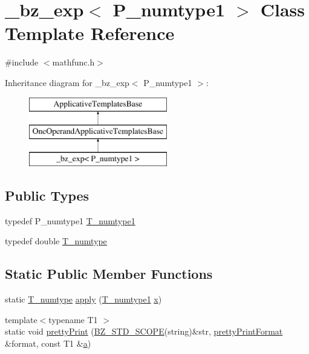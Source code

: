 \hypertarget{class__bz__exp}{}\section{\+\_\+bz\+\_\+exp$<$ P\+\_\+numtype1 $>$ Class Template Reference}
\label{class__bz__exp}


{\ttfamily \#include $<$mathfunc.\+h$>$}

Inheritance diagram for \+\_\+bz\+\_\+exp$<$ P\+\_\+numtype1 $>$\+:\begin{figure}[H]
\begin{center}
\leavevmode
\includegraphics[height=3.000000cm]{class__bz__exp}
\end{center}
\end{figure}
\subsection*{Public Types}
\begin{DoxyCompactItemize}
\item 
typedef P\+\_\+numtype1 \hyperlink{class__bz__exp_aa9c92ca2a46332b3e8418ecfeaae1623}{T\+\_\+numtype1}
\item 
typedef double \hyperlink{class__bz__exp_a8546e171099a34ab05d8185b000708ff}{T\+\_\+numtype}
\end{DoxyCompactItemize}
\subsection*{Static Public Member Functions}
\begin{DoxyCompactItemize}
\item 
static \hyperlink{class__bz__exp_a8546e171099a34ab05d8185b000708ff}{T\+\_\+numtype} \hyperlink{class__bz__exp_a596294eadb0ed385c4b0a34d656483ab}{apply} (\hyperlink{class__bz__exp_aa9c92ca2a46332b3e8418ecfeaae1623}{T\+\_\+numtype1} \hyperlink{vecnorm1_8cc_ac73eed9e41ec09d58f112f06c2d6cb63}{x})
\item 
{\footnotesize template$<$typename T1 $>$ }\\static void \hyperlink{class__bz__exp_a964a6184e84f2683580073b0a85d9e7a}{pretty\+Print} (\hyperlink{numinquire_8h_a2b24ffc3b4ef9803956bc7715c6c7b83}{B\+Z\+\_\+\+S\+T\+D\+\_\+\+S\+C\+O\+P\+E}(string)\&str, \hyperlink{classprettyPrintFormat}{pretty\+Print\+Format} \&format, const T1 \&\hyperlink{gen__mat5files_8m_aae328bf20413f220e38aec4d95bfd6da}{a})
\end{DoxyCompactItemize}


